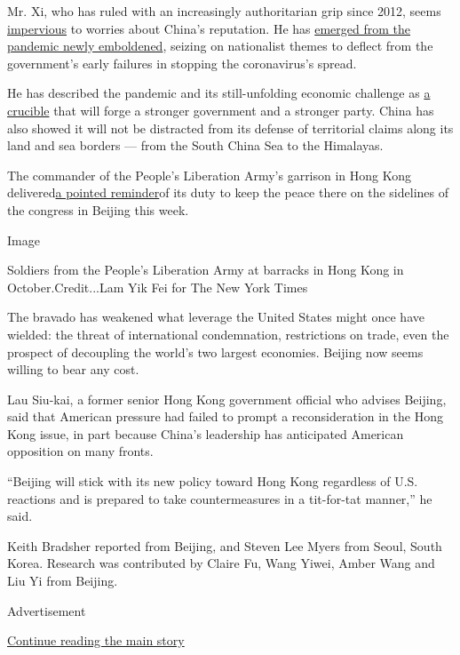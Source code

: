 Mr. Xi, who has ruled with an increasingly authoritarian grip since
2012, seems
\href{https://www.nytimes3xbfgragh.onion/2020/05/24/world/asia/china-hong-kong-taiwan.html}{impervious}
to worries about China's reputation. He has
\href{https://www.nytimes3xbfgragh.onion/2020/05/20/world/asia/coronavirus-china-xi-jinping.html}{emerged
from the pandemic newly emboldened}, seizing on nationalist themes to
deflect from the government's early failures in stopping the
coronavirus's spread.

He has described the pandemic and its still-unfolding economic challenge
as
\href{https://www.nytimes3xbfgragh.onion/2020/05/20/world/asia/coronavirus-china-xi-jinping.html}{a
crucible} that will forge a stronger government and a stronger party.
China has also showed it will not be distracted from its defense of
territorial claims along its land and sea borders --- from the South
China Sea to the Himalayas.

The commander of the People's Liberation Army's garrison in Hong Kong
delivered\href{https://www.nytimes3xbfgragh.onion/2020/05/26/world/asia/china-military-hong-kong.html}{a
pointed reminder}of its duty to keep the peace there on the sidelines of
the congress in Beijing this week.

Image

Soldiers from the People's Liberation Army at barracks in Hong Kong in
October.Credit...Lam Yik Fei for The New York Times

The bravado has weakened what leverage the United States might once have
wielded: the threat of international condemnation, restrictions on
trade, even the prospect of decoupling the world's two largest
economies. Beijing now seems willing to bear any cost.

Lau Siu-kai, a former senior Hong Kong government official who advises
Beijing, said that American pressure had failed to prompt a
reconsideration in the Hong Kong issue, in part because China's
leadership has anticipated American opposition on many fronts.

``Beijing will stick with its new policy toward Hong Kong regardless of
U.S. reactions and is prepared to take countermeasures in a tit-for-tat
manner,'' he said.

Keith Bradsher reported from Beijing, and Steven Lee Myers from Seoul,
South Korea. Research was contributed by Claire Fu, Wang Yiwei, Amber
Wang and Liu Yi from Beijing.

Advertisement

\protect\hyperlink{after-bottom}{Continue reading the main story}

